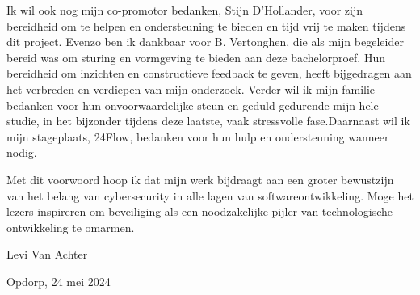 Ik wil ook nog mijn co-promotor bedanken, Stijn D'Hollander, voor zijn bereidheid om te helpen en ondersteuning te bieden en tijd vrij te maken 
tijdens dit project. Evenzo ben ik dankbaar voor B. Vertonghen, die als mijn begeleider bereid was om sturing en vormgeving te 
bieden aan deze bachelorproef. Hun bereidheid om inzichten en constructieve feedback te geven, heeft bijgedragen aan het verbreden en verdiepen van mijn onderzoek.
Verder wil ik mijn familie bedanken voor hun onvoorwaardelijke steun en geduld gedurende mijn hele studie, in het bijzonder tijdens deze laatste, 
vaak stressvolle fase.Daarnaast wil ik mijn stageplaats, 24Flow, bedanken voor hun hulp en ondersteuning wanneer nodig.

Met dit voorwoord hoop ik dat mijn werk bijdraagt aan een groter bewustzijn van het belang van cybersecurity in alle lagen van softwareontwikkeling. 
Moge het lezers inspireren om beveiliging als een noodzakelijke pijler van technologische ontwikkeling te omarmen.


Levi Van Achter

Opdorp, 24 mei 2024
